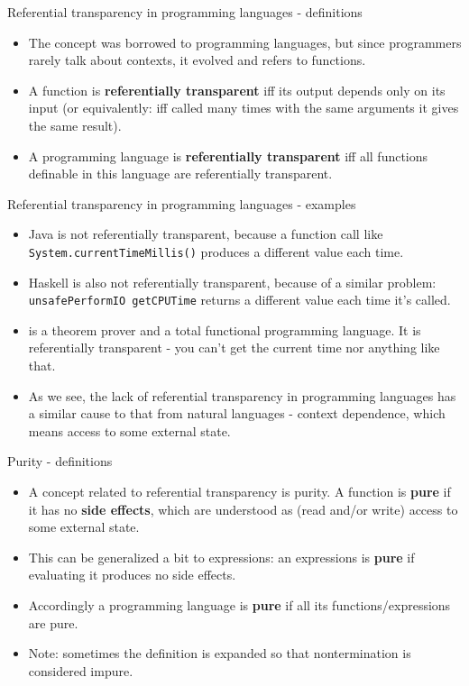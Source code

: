 \documentclass{beamer}
\newcommand{\link}[2]{\href{#2}{\color{blue}{#1}}}
\begin{document}
\begin{frame}{Referential transparency in programming languages - definitions}
\begin{itemize}
	\item The concept was borrowed to programming languages, but since programmers rarely talk about contexts, it evolved and refers to functions.
	\item A function is \textbf{referentially transparent} iff its output depends only on its input (or equivalently: iff called many times with the same arguments it gives the same result).
	\item A programming language is \textbf{referentially transparent} iff all functions definable in this language are referentially transparent.
\end{itemize}
\end{frame}

\begin{frame}{Referential transparency in programming languages - examples}
\begin{itemize}
	\item Java is not referentially transparent, because a function call like \texttt{System.currentTimeMillis()} produces a different value each time.
	\item Haskell is also not referentially transparent, because of a similar problem: \texttt{unsafePerformIO getCPUTime} returns a different value each time it's called.
	\item \link{Coq}{https://coq.inria.fr/} is a theorem prover and a total functional programming language. It is referentially transparent - you can't get the current time nor anything like that.
	\item As we see, the lack of referential transparency in programming languages has a similar cause to that from natural languages - context dependence, which means access to some external state.
\end{itemize}
\end{frame}

\begin{frame}{Purity - definitions}
\begin{itemize}
	\item A concept related to referential transparency is purity. A function is \textbf{pure} if it has no \textbf{side effects}, which are understood as (read and/or write) access to some external state.
	\item This can be generalized a bit to expressions: an expressions is \textbf{pure} if evaluating it produces no side effects.
	\item Accordingly a programming language is \textbf{pure} if all its functions/expressions are pure.
	\item Note: sometimes the definition is expanded so that nontermination is considered impure.
\end{itemize}
\end{frame}
\end{document}
